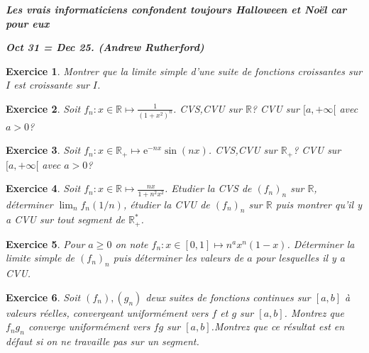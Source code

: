 \documentclass[12pt,a4paper]{article}
\newcommand{\R}{\mathbb{R}}
\theoremstyle{break}
\theoremstyle{break}
\newtheorem{Exo}{Exercice}
\begin{document}
\emph{\textbf{
		Les vrais informaticiens confondent toujours Halloween et Noël car pour eux 
}}

\emph{\textbf{
	Oct 31 = Dec 25.
		(Andrew Rutherford)
}}

\begin{Exo}
	Montrer que la limite simple d'une suite de fonctions croissantes sur $I$ est croissante sur $I$.
\end{Exo}

\begin{Exo}
Soit $f_n:x\in\R\mapsto \frac{1}{(1+x^2)^n}$. CVS,CVU sur $\R$? CVU sur $[a,+\infty[$ avec $a>0$?
\end{Exo}

\begin{Exo}
Soit $f_n:x\in\R_+\mapsto \mathrm{e}^{-nx}\sin(nx)$. CVS,CVU sur $\R_+$? CVU sur $[a,+\infty[$ avec $a>0$?
\end{Exo}

\begin{Exo}
	Soit $f_n:x\in\R\mapsto \frac{nx}{1+n^2x^2}$. Etudier la CVS de $(f_n)_n$ sur $\R$, déterminer $\lim_n f_n(1/n)$, étudier  la CVU de $(f_n)_n$ sur $\R$ puis montrer qu'il y a CVU sur tout segment de $\R_+^*$.

\end{Exo}

%

\begin{Exo}
Pour $a\geqslant 0$ on note $f_n:x\in[0,1]\mapsto n^a x^n(1-x)$. Déterminer la limite simple de $(f_n)_n$ puis déterminer les valeurs de $a$ pour lesquelles il y a CVU.
\end{Exo}

\begin{Exo}
	Soit $\left( f_{n}\right) ,\left( g_{n}\right) $ deux suites de fonctions continues sur $\left[ a,b\right] $ à valeurs r\'{e}elles, convergeant	uniformément vers $f$ et $g$ sur $\left[ a,b\right]$. Montrez que $f_{n}g_{n}$ converge uniformément vers $fg$ sur $\left[ a,b\right]$.Montrez que ce résultat est en défaut si on ne travaille pas sur un
	segment.
\end{Exo}
\end{document}
